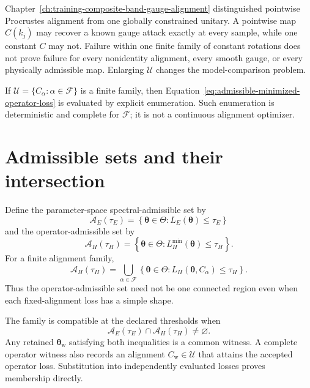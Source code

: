 Chapter~\ref{ch:training-composite-band-gauge-alignment} distinguished
pointwise Procrustes alignment from one globally constrained unitary. A
pointwise map $C(k_j)$ may recover a known gauge attack exactly at every sample,
while one constant $C$ may not. Failure within one finite family of constant
rotations does not prove failure for every nonidentity alignment, every smooth
gauge, or every physically admissible map. Enlarging $\mathcal U$ changes the
model-comparison problem.

If $\mathcal U=\{C_{\alpha}:\alpha\in\mathcal F\}$ is a finite family, then
Equation~\eqref{eq:admissible-minimized-operator-loss} is evaluated by explicit
enumeration. Such enumeration is deterministic and complete for
$\mathcal F$; it is not a continuous alignment optimizer.

\section{Admissible sets and their intersection}

Define the parameter-space spectral-admissible set by
\begin{equation}
  \mathcal A_E(\tau_E)
  =
  \left\{
    \boldsymbol\theta\in\Theta:
    L_E(\boldsymbol\theta)\leq\tau_E
  \right\}
  \label{eq:admissible-spectral-set}
\end{equation}
and the operator-admissible set by
\begin{equation}
  \mathcal A_H(\tau_H)
  =
  \left\{
    \boldsymbol\theta\in\Theta:
    L_H^{\min}(\boldsymbol\theta)\leq\tau_H
  \right\}.
  \label{eq:admissible-operator-set}
\end{equation}
For a finite alignment family,
\begin{equation}
  \mathcal A_H(\tau_H)
  =
  \bigcup_{\alpha\in\mathcal F}
  \left\{
    \boldsymbol\theta\in\Theta:
    L_H(\boldsymbol\theta,C_{\alpha})\leq\tau_H
  \right\}.
  \label{eq:admissible-operator-union}
\end{equation}
Thus the operator-admissible set need not be one connected region even when
each fixed-alignment loss has a simple shape.

The family is compatible at the declared thresholds when
\begin{equation}
  \mathcal A_E(\tau_E)
  \cap
  \mathcal A_H(\tau_H)
  \neq\varnothing.
  \label{eq:admissible-common-intersection}
\end{equation}
Any retained $\boldsymbol\theta_{\mathrm w}$ satisfying both inequalities is a
common witness. A complete operator witness also records an alignment
$C_{\mathrm w}\in\mathcal U$ that attains the accepted operator loss.
Substitution into independently evaluated losses proves membership directly.

